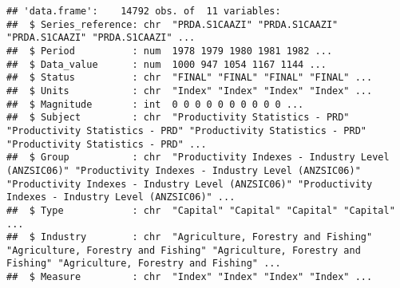 \documentclass[
]{article}
\begin{document}
\begin{verbatim}
## 'data.frame':    14792 obs. of  11 variables:
##  $ Series_reference: chr  "PRDA.S1CAAZI" "PRDA.S1CAAZI" "PRDA.S1CAAZI" "PRDA.S1CAAZI" ...
##  $ Period          : num  1978 1979 1980 1981 1982 ...
##  $ Data_value      : num  1000 947 1054 1167 1144 ...
##  $ Status          : chr  "FINAL" "FINAL" "FINAL" "FINAL" ...
##  $ Units           : chr  "Index" "Index" "Index" "Index" ...
##  $ Magnitude       : int  0 0 0 0 0 0 0 0 0 0 ...
##  $ Subject         : chr  "Productivity Statistics - PRD" "Productivity Statistics - PRD" "Productivity Statistics - PRD" "Productivity Statistics - PRD" ...
##  $ Group           : chr  "Productivity Indexes - Industry Level (ANZSIC06)" "Productivity Indexes - Industry Level (ANZSIC06)" "Productivity Indexes - Industry Level (ANZSIC06)" "Productivity Indexes - Industry Level (ANZSIC06)" ...
##  $ Type            : chr  "Capital" "Capital" "Capital" "Capital" ...
##  $ Industry        : chr  "Agriculture, Forestry and Fishing" "Agriculture, Forestry and Fishing" "Agriculture, Forestry and Fishing" "Agriculture, Forestry and Fishing" ...
##  $ Measure         : chr  "Index" "Index" "Index" "Index" ...
\end{verbatim}
\end{document}
